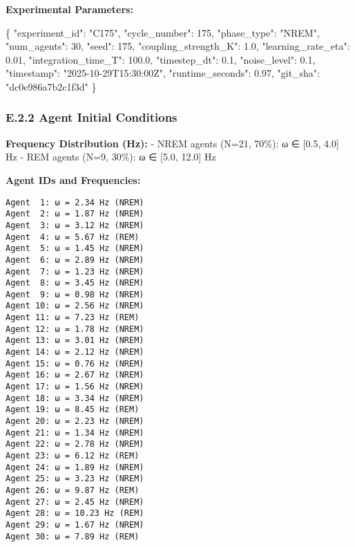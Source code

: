 \documentclass[
]{article}
\newenvironment{Shaded}{}{}
\newcommand{\DataTypeTok}[1]{\textcolor[rgb]{0.56,0.13,0.00}{#1}}
\newcommand{\DecValTok}[1]{\textcolor[rgb]{0.25,0.63,0.44}{#1}}
\newcommand{\FloatTok}[1]{\textcolor[rgb]{0.25,0.63,0.44}{#1}}
\newcommand{\FunctionTok}[1]{\textcolor[rgb]{0.02,0.16,0.49}{#1}}
\newcommand{\StringTok}[1]{\textcolor[rgb]{0.25,0.44,0.63}{#1}}
\begin{document}
\textbf{Experimental Parameters:}

\begin{Shaded}
\begin{Highlighting}[]
\FunctionTok{\{}
  \DataTypeTok{"experiment\_id"}\FunctionTok{:} \StringTok{"C175"}\FunctionTok{,}
  \DataTypeTok{"cycle\_number"}\FunctionTok{:} \DecValTok{175}\FunctionTok{,}
  \DataTypeTok{"phase\_type"}\FunctionTok{:} \StringTok{"NREM"}\FunctionTok{,}
  \DataTypeTok{"num\_agents"}\FunctionTok{:} \DecValTok{30}\FunctionTok{,}
  \DataTypeTok{"seed"}\FunctionTok{:} \DecValTok{175}\FunctionTok{,}
  \DataTypeTok{"coupling\_strength\_K"}\FunctionTok{:} \FloatTok{1.0}\FunctionTok{,}
  \DataTypeTok{"learning\_rate\_eta"}\FunctionTok{:} \FloatTok{0.01}\FunctionTok{,}
  \DataTypeTok{"integration\_time\_T"}\FunctionTok{:} \FloatTok{100.0}\FunctionTok{,}
  \DataTypeTok{"timestep\_dt"}\FunctionTok{:} \FloatTok{0.1}\FunctionTok{,}
  \DataTypeTok{"noise\_level"}\FunctionTok{:} \FloatTok{0.1}\FunctionTok{,}
  \DataTypeTok{"timestamp"}\FunctionTok{:} \StringTok{"2025{-}10{-}29T15:30:00Z"}\FunctionTok{,}
  \DataTypeTok{"runtime\_seconds"}\FunctionTok{:} \FloatTok{0.97}\FunctionTok{,}
  \DataTypeTok{"git\_sha"}\FunctionTok{:} \StringTok{"dc0e986a7b2c1f3d"}
\FunctionTok{\}}
\end{Highlighting}
\end{Shaded}

\subsubsection{E.2.2 Agent Initial
Conditions}\label{e.2.2-agent-initial-conditions}

\textbf{Frequency Distribution (Hz):} - NREM agents (N=21, 70\%): ω ∈
{[}0.5, 4.0{]} Hz - REM agents (N=9, 30\%): ω ∈ {[}5.0, 12.0{]} Hz

\textbf{Agent IDs and Frequencies:}

\begin{verbatim}
Agent  1: ω = 2.34 Hz (NREM)
Agent  2: ω = 1.87 Hz (NREM)
Agent  3: ω = 3.12 Hz (NREM)
Agent  4: ω = 5.67 Hz (REM)
Agent  5: ω = 1.45 Hz (NREM)
Agent  6: ω = 2.89 Hz (NREM)
Agent  7: ω = 1.23 Hz (NREM)
Agent  8: ω = 3.45 Hz (NREM)
Agent  9: ω = 0.98 Hz (NREM)
Agent 10: ω = 2.56 Hz (NREM)
Agent 11: ω = 7.23 Hz (REM)
Agent 12: ω = 1.78 Hz (NREM)
Agent 13: ω = 3.01 Hz (NREM)
Agent 14: ω = 2.12 Hz (NREM)
Agent 15: ω = 0.76 Hz (NREM)
Agent 16: ω = 2.67 Hz (NREM)
Agent 17: ω = 1.56 Hz (NREM)
Agent 18: ω = 3.34 Hz (NREM)
Agent 19: ω = 8.45 Hz (REM)
Agent 20: ω = 2.23 Hz (NREM)
Agent 21: ω = 1.34 Hz (NREM)
Agent 22: ω = 2.78 Hz (NREM)
Agent 23: ω = 6.12 Hz (REM)
Agent 24: ω = 1.89 Hz (NREM)
Agent 25: ω = 3.23 Hz (NREM)
Agent 26: ω = 9.87 Hz (REM)
Agent 27: ω = 2.45 Hz (NREM)
Agent 28: ω = 10.23 Hz (REM)
Agent 29: ω = 1.67 Hz (NREM)
Agent 30: ω = 7.89 Hz (REM)
\end{verbatim}
\end{document}
